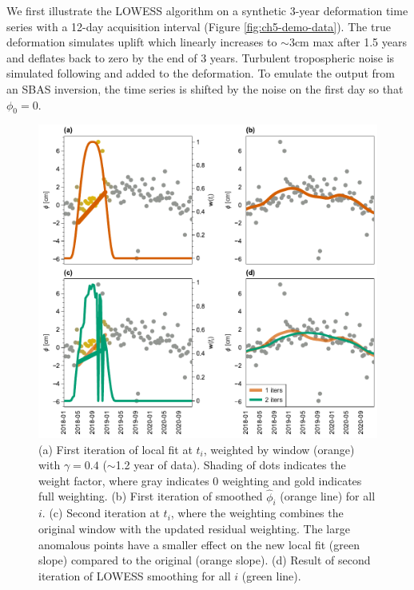 We first illustrate the LOWESS algorithm on a synthetic 3-year deformation time series with a 12-day acquisition interval (Figure \ref{fig:ch5-demo-data}).
The true deformation simulates uplift which linearly increases to $ \sim3 $cm max after 1.5 years and deflates back to zero by the end of 3 years. 
Turbulent tropospheric noise is simulated following \cite{Hanssen2001RadarInterferometryData} and added to the deformation.
To emulate the output from an SBAS inversion, the time series is shifted by the noise on the first day so that $ \phi_0 = 0 $.



\begin{figure}
	\centering
	\includegraphics[width=.99\textwidth]{figures/chapter5-lowess/figure3-fits.pdf}
	\caption[Demo of LOWESS fitting]{
		(a) First iteration of local fit at $t_i$, weighted by window (orange) with $ \gamma=0.4 $ ($ \sim $1.2 year of data). Shading of dots indicates the weight factor, where gray indicates 0 weighting and gold indicates full weighting.
		(b) First iteration of smoothed $ \hat{\phi}_i $ (orange line) for all $i$. 
		(c) Second iteration at $t_i$, where the weighting combines the original window with the updated residual weighting. The large anomalous points have a smaller effect on the new local fit (green slope) compared to the original (orange slope).
		(d) Result of second iteration of LOWESS smoothing for all $i$ (green line).
	}
	\label{fig:ch5-algo-demo}
\end{figure}



